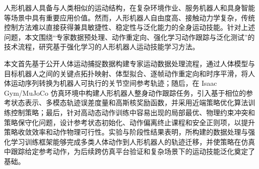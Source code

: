 \begin{cabstract}

人形机器人具备与人类相似的运动结构，在复杂环境作业、服务机器人和具身智能等场景中具有重要应用价值。然而，人形机器人自由度高、接触动力学复杂，传统控制方法难以直接获得兼具敏捷性、稳定性与泛化能力的全身运动技能。针对上述问题，本文围绕“专家数据预处理、动作重定向、强化学习动作跟踪与泛化测试”的技术流程，研究基于强化学习的人形机器人运动技能学习方法。

本文首先基于公开人体运动捕捉数据构建专家运动数据处理流程，通过人体模型与目标机器人之间的关键点拓扑映射、体型拟合、逐帧动作重定向和时序平滑，将人体运动序列转换为机器人可执行的关节空间参考轨迹；随后，在 Isaac Gym/MuJoCo 仿真环境中构建人形机器人整身动作跟踪任务，引入基于相位的参考状态表示、多模态轨迹误差度量和高斯核奖励函数，并采用近端策略优化算法训练控制策略；最后，针对高动态动作训练中容易出现的局部最优、物理约束冲突和策略保守化问题，设计参考状态初始化、动作偏离终止课程和安全正则项，以提升策略收敛效率和动作物理可行性。实验与阶段性结果表明，所构建的数据处理与强化学习训练框架能够完成多类人体动作到人形机器人的轨迹迁移，并使策略在仿真中跟踪给定参考动作，为后续跨仿真平台验证和复杂场景下的运动技能泛化奠定了基础。
\end{cabstract}


